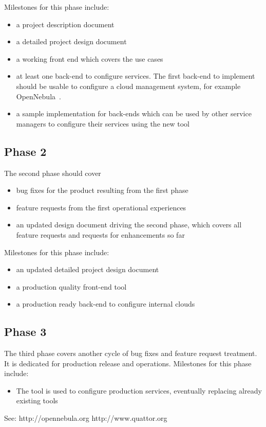 \documentclass[12pt]{article}
\begin{document}
Milestones for this phase include:
\begin{itemize}
\item a project description document
\item a detailed project design document
\item a working front end which covers the use cases 
\item at least one back-end to configure services. The first back-end to implement should be usable to configure a cloud management system, 
for example OpenNebula~\cite{ONE}. 
\item a sample implementation for back-ends which can be used by other service managers to configure their services using the new tool
\end{itemize}

\subsection{Phase 2}
The second phase should cover 
\begin{itemize}
\item bug fixes for the product resulting from the first phase
\item feature requests from the first operational experiences
\item an updated design document driving the second phase, which covers all feature requests and requests for enhancements so far
\end{itemize}

Milestones for this phase include:
\begin{itemize}
\item an updated detailed project design document
\item a production quality front-end tool
\item a production ready back-end to configure internal clouds 
\end{itemize}

\subsection{Phase 3}
The third phase covers another cycle of bug fixes and feature request treatment. It is dedicated for production release and operations. 
Milestones for this phase include:
\begin{itemize}
\item The tool is used to configure production services, eventually replacing already existing tools 
\end{itemize}



\begin{thebibliography}{99}
See: http://opennebula.org
http://www.quattor.org
\end{thebibliography}
\end{document}
